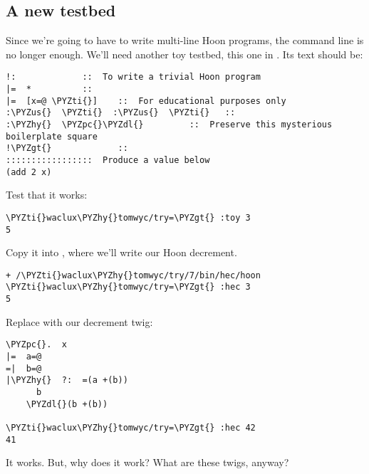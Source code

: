 \subsection{A new testbed}

Since we're going to have to write multi-line Hoon programs, the
command line is no longer enough.  We'll need another toy
testbed, this one in .
Its text should be:

\begin{framed_shaded}
\begin{Verbatim}[fontsize=\relsize{-2.5},fontseries=b,commandchars=\\\{\}]
!:             ::  To write a trivial Hoon program
|=  *          ::
|=  [x=@ \PYZti{}]    ::  For educational purposes only
:\PYZus{}  \PYZti{}  :\PYZus{}  \PYZti{}   ::
:\PYZhy{}  \PYZpc{}\PYZdl{}         ::  Preserve this mysterious boilerplate square
!\PYZgt{}             ::
:::::::::::::::::  Produce a value below
(add 2 x)
\end{Verbatim}
\end{framed_shaded}
Test that it works: 

\begin{framed_shaded}
\begin{Verbatim}[fontsize=\relsize{-2.5},fontseries=b,commandchars=\\\{\}]
\PYZti{}waclux\PYZhy{}tomwyc/try=\PYZgt{} :toy 3
5
\end{Verbatim}
\end{framed_shaded}
Copy it into , where we'll write our Hoon decrement.

\begin{framed_shaded}
\begin{Verbatim}[fontsize=\relsize{-2.5},fontseries=b,commandchars=\\\{\}]
+ /\PYZti{}waclux\PYZhy{}tomwyc/try/7/bin/hec/hoon
\PYZti{}waclux\PYZhy{}tomwyc/try=\PYZgt{} :hec 3
5
\end{Verbatim}
\end{framed_shaded}
Replace  with our decrement twig:

\begin{framed_shaded}
\begin{Verbatim}[fontsize=\relsize{-2.5},fontseries=b,commandchars=\\\{\}]
\PYZpc{}.  x
|=  a=@
=|  b=@
|\PYZhy{}  ?:  =(a +(b))
      b
    \PYZdl{}(b +(b))

\PYZti{}waclux\PYZhy{}tomwyc/try=\PYZgt{} :hec 42
41
\end{Verbatim}
\end{framed_shaded}
It works.  But, why does it work?  What are these twigs, anyway?

